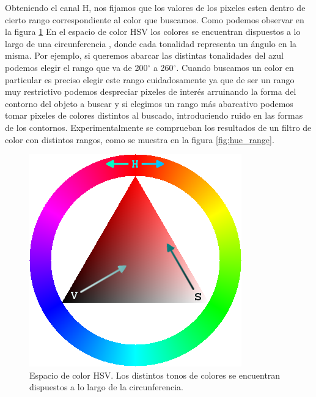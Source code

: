 Obteniendo el canal H, nos fijamos que los valores de los pixeles esten dentro de cierto rango correspondiente al color que buscamos. Como podemos observar en la figura \ref{fig:hsv_space} En el espacio de color HSV los colores se encuentran dispuestos a lo largo de una circunferencia , donde cada tonalidad representa un ángulo en la misma. Por ejemplo, si queremos abarcar las distintas tonalidades del azul podemos elegir el rango que va de 200$^\circ$ a 260$^\circ$. Cuando buscamos un color en particular  es preciso elegir este rango cuidadosamente ya que de ser un rango muy restrictivo podemos despreciar pixeles de interés arruinando la forma del contorno del objeto a buscar y si elegimos un rango más abarcativo podemos tomar pixeles de colores distintos al buscado, introduciendo ruido en las formas de los contornos. Experimentalmente se comprueban los resultados de un filtro de color con distintos rangos, como se muestra  en la figura \ref{fig:hue_range}.
\begin{figure}[tpb]
\begin{center}
  \includegraphics[scale=0.4]{figuras/hsv_triangle.png}
\end{center}
  \caption{\small Espacio de color HSV. Los distintos tonos de colores se encuentran dispuestos a lo largo de la circunferencia.}
  \label{fig:hsv_space}
\end{figure}

